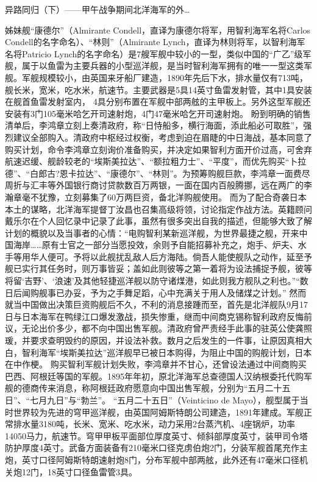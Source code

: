\documentclass[12pt,UTF8]{ctexbook}
\begin{document}
异路同归（下）——甲午战争期间北洋海军的外…

姊妹舰“康德尔”（Almirante Condell，直译为康德尔将军，用智利海军名将Carlos Condell的名字命名）、“林则”（Almirante Lynch，直译为林则将军，以智利海军名将Patricio Lynch的名字命名）是7艘军舰中较小的一型，类似中国的“广乙”级军舰，属于以鱼雷为主要兵器的小型巡洋舰，是当时智利海军拥有的唯一一型这类军舰。军舰规模较小，由英国来牙船厂建造，1890年先后下水，排水量仅有713吨，舰长米，宽米，吃水米，航速节。主要武器是5具14英寸鱼雷发射管，其中1具安装在舰首鱼雷发射室内， 4具分别布置在军舰中部两舷的主甲板上。另外这型军舰还安装有3门105毫米哈乞开司速射炮，4门47毫米哈乞开司速射炮。
盼到明确的销售清单后，李鸿章立刻上奏清政府，称“日恃船多，横行海面，添此船必可取胜”，强烈建议全部购入。清政府中枢经过权衡，考虑到迫在眉睫的中日海战，基本同意了购买计划，命令李鸿章立刻询价准备购买，并决定如果智利方面开价过高，可舍弃航速迟缓、舰龄较老的“埃斯美拉达”、“额拉粗力士”、“平度”，而优先购买“卜拉德”、“白郎古?恩卡拉达”、“康德尔”、“林则”。为预筹购舰巨款，李鸿章一面费尽周折与汇丰等外国银行商讨贷款数百万两银，一面在国内百般腾挪，远在两广的李瀚章毫不犹豫，立刻募集了60万两巨资，备北洋购舰使用。 而为了配合奇袭日本本土的谋略，北洋海军提督丁汝昌也召集高级将领，讨论指定作战方法。英籍顾问戴乐尔在个人回忆录中记录了此事，虽然有很多突出自我的描述，但能够大致了解计划的概貌以及当事者的心情：“电购智利某新巡洋舰，为世界最捷之舰，开来中国海岸……原有士官之一部分当愿投效，余则予自能招募补充之，炮手、炉夫、水手等用华人便可。予将以此舰扰乱敌人后方海陆。倘吾人能使舰队之动作，延至予舰已实行其任务时，则万事皆妥；盖如此则彼等之第一着将为设法捕捉予舰，彼等将留‘吉野’、‘浪速’及其他轻捷巡洋舰以防守诸煤港，如此则我方舰队之利也。”“数日后闻购舰事已办妥，予为之手舞足蹈，心中充满关于用人及储煤之计划。”
然而就当中国做出决策巨资购舰后不久，不利的消息接踵而至，首先是北洋舰队9月17日与日本海军在鸭绿江口爆发激战，损失惨重，继而中间商克锡称智利政府反悔前议，无论出价多少，都不向中国出售军舰。清政府曾严责经手此事的驻英公使龚照瑗，并要求查明毁约的原因，并设法补救。数月之后发生的一件事，让原因真相大白，智利海军“埃斯美拉达”巡洋舰早已被日本购得，为阻止中国的购舰计划，日本在中作梗。
购买智利军舰计划失败，李鸿章并不甘心，还曾设法通过中间商购买巴西、阿根廷等国的军舰。1895年年初，原北洋海军总查德国人汉纳根委托代购军舰的德商传来消息，称阿根廷政府愿意向中国出售军舰，分别为“五月二十五日”、“七月九日”与“勃兰”。
“五月二十五日”（Veinticino de Mayo），舰型属于当时世界较为先进的穹甲巡洋舰，由英国阿姆斯特朗公司建造，1891年建成。军舰正常排水量3180吨，长米、宽米、吃水米，动力采用2台蒸汽机、4座锅炉，功率14050马力，航速节。穹甲甲板平面部位厚度英寸、倾斜部厚度英寸，装甲司令塔防护厚度4英寸。武备方面装备有210毫米口径克虏伯炮2门，分装军舰首尾充作主炮，英寸口径阿姆斯特朗速射炮8门，分布军舰中部两舷，此外还有47毫米口径机关炮12门，18英寸口径鱼雷管3具。
\end{document}
